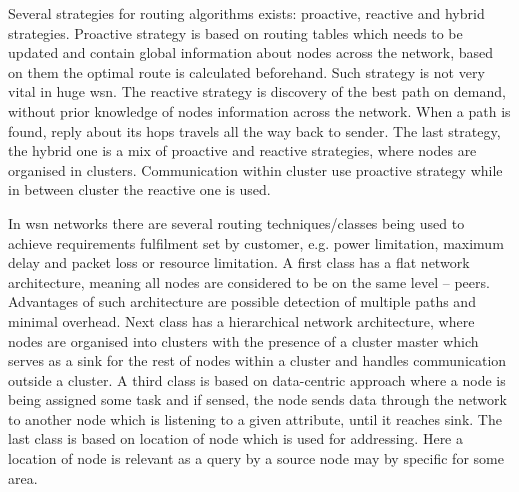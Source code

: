 Several strategies for routing algorithms exists: proactive, reactive and hybrid strategies. Proactive strategy is based on routing tables which needs to be updated and contain global information about nodes across the network, based on them the optimal route is calculated beforehand. Such strategy is not very vital in huge \acrshort{wsn}. The reactive strategy is discovery of the best path on demand, without prior knowledge of nodes information across the network. When a path is found, reply about its hops travels all the way back to sender. The last strategy, the hybrid one is a mix of proactive and reactive strategies, where nodes are organised in clusters. Communication within cluster use proactive strategy while in between cluster the reactive one is used.

In \acrshort{wsn} networks there are several routing techniques/classes being used to achieve requirements fulfilment set by customer, e.g. power limitation, maximum delay and packet loss or resource limitation. A first class has a flat network architecture, meaning all nodes are considered to be on the same level – peers. Advantages of such architecture are possible detection of multiple paths and minimal overhead. Next class has a hierarchical network architecture, where nodes are organised into clusters with the presence of a cluster master which serves as a sink for the rest of nodes within a cluster and handles communication outside a cluster. A third class is based on data-centric approach where a node is being assigned some task and if sensed, the node sends data through the network to another node which is listening to a given attribute, until it reaches sink. The last class is based on location of node which is used for addressing. Here a location of node is relevant as a query by a source node may by specific for some area.

